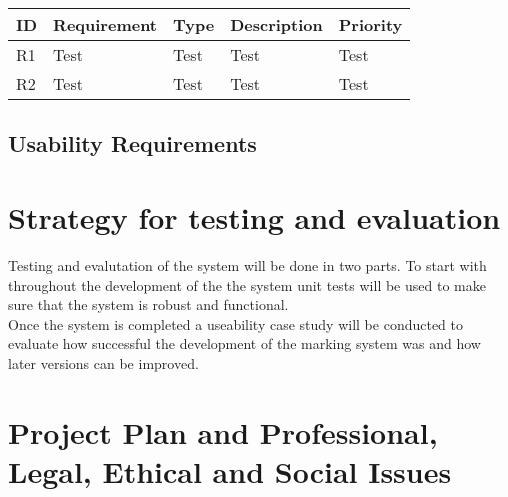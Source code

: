 \documentclass[12pt]{article}  %
\theoremstyle{definition}
\theoremstyle{remark}
\begin{document}
\begin{tabularx}{\textwidth}{|l|X|X|X|X|}
\hline
  \textbf{ID} & \textbf{Requirement} & \textbf{Type} & \textbf{Description} & \textbf{Priority} 
\\
\hline
R1&Test&Test&Test&Test\\ \hline
R2&Test&Test&Test&Test\\ \hline


\end{tabularx}

\subsection{Usability Requirements}


\newpage
\section{Strategy for testing and evaluation}

\doublespacing
Testing and evalutation of the system will be done in two parts. To start with throughout the development of the the system unit tests will be used to make sure that the system is robust and functional. \\
Once the system is completed a useability case study will be conducted to evaluate how successful the development of the marking system  was and how later versions can be improved.

\singlespacing

\newpage
\section{Project Plan and Professional, Legal, Ethical and Social Issues}
\end{document}
